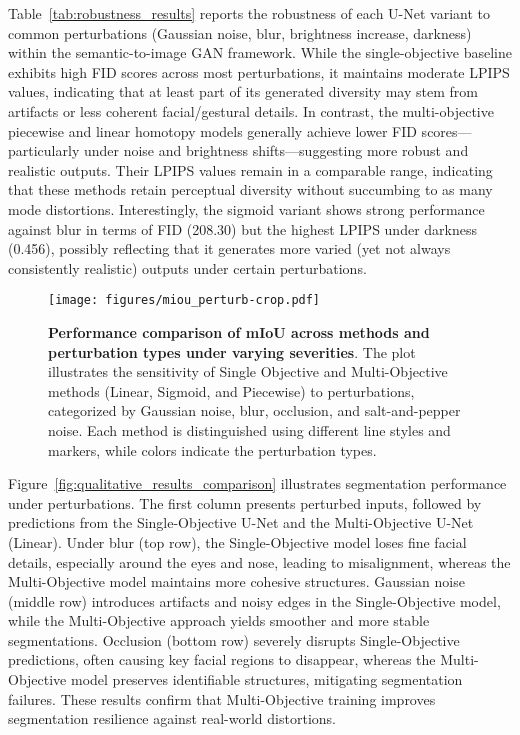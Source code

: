 Table~\ref{tab:robustness_results} reports the robustness of each U-Net variant to common perturbations (Gaussian noise, blur, brightness increase, darkness) within the semantic-to-image GAN framework. While the single-objective baseline exhibits high FID scores across most perturbations, it maintains moderate LPIPS values, indicating that at least part of its generated diversity may stem from artifacts or less coherent facial/gestural details. In contrast, the multi-objective piecewise and linear homotopy models generally achieve lower FID scores—particularly under noise and brightness shifts—suggesting more robust and realistic outputs. Their LPIPS values remain in a comparable range, indicating that these methods retain perceptual diversity without succumbing to as many mode distortions. Interestingly, the sigmoid variant shows strong performance against blur in terms of FID (208.30) but the highest LPIPS under darkness (0.456), possibly reflecting that it generates more varied (yet not always consistently realistic) outputs under certain perturbations. 

\begin{figure}[ht]
    \centering
    \texttt{[image: figures/miou\_perturb-crop.pdf]}
    \caption{\textbf{Performance comparison of mIoU across methods and perturbation types under varying severities}. The plot illustrates the sensitivity of Single Objective and Multi-Objective methods (Linear, Sigmoid, and Piecewise) to perturbations, categorized by Gaussian noise, blur, occlusion, and salt-and-pepper noise. Each method is distinguished using different line styles and markers, while colors indicate the perturbation types.}
    \label{fig:miou_perturb_chart}
\end{figure}

Figure~\ref{fig:qualitative_results_comparison} illustrates segmentation performance under perturbations. The first column presents perturbed inputs, followed by predictions from the Single-Objective U-Net and the Multi-Objective U-Net (Linear). Under blur (top row), the Single-Objective model loses fine facial details, especially around the eyes and nose, leading to misalignment, whereas the Multi-Objective model maintains more cohesive structures. Gaussian noise (middle row) introduces artifacts and noisy edges in the Single-Objective model, while the Multi-Objective approach yields smoother and more stable segmentations. Occlusion (bottom row) severely disrupts Single-Objective predictions, often causing key facial regions to disappear, whereas the Multi-Objective model preserves identifiable structures, mitigating segmentation failures. These results confirm that Multi-Objective training improves segmentation resilience against real-world distortions.


